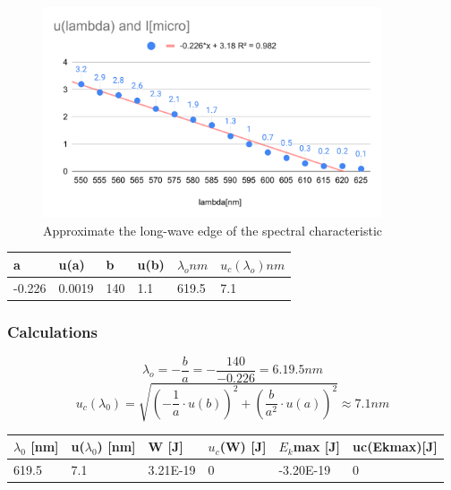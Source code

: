 \begin{figure}[H]
	\centering
	\includegraphics[width=10cm]{schematics/spectralCharacteristic.pdf}
	\caption{Approximate the long-wave edge of the spectral characteristic}
\end{figure}

\begin{table}[H]
    \centering
    \begin{tabular}{l|l|l|l|l|l}
        a & u(a) & b & u(b) & $\lambda_o nm$ & $u_c(\lambda_o) nm$ \\ \hline
        -0.226 & 0.0019 & 140 & 1.1 & 619.5 & 7.1 \\ 
    \end{tabular}
\end{table}

\subsubsection*{Calculations }

\begin{equation}
	\lambda_o = - \frac{b}{a} = -\frac{140}{-0.226} = 6.19.5 nm
\end{equation}
\begin{equation}
	u_c(\lambda_0)=\sqrt{(-\frac1a \cdot u(b))^2 + (\frac{b}{a^2} \cdot u(a))^2} \approx 7.1nm
\end{equation}

\begin{table}[H]
    \centering
    \begin{tabular}{l|l|l|l|l|l}

        $\lambda_0$ [nm] & u($\lambda_0$) [nm] & W [J] & $u_c$(W) [J] & $E_k$max [J] & uc(Ekmax)[J] \\ \hline
        619.5 & 7.1 & 3.21E-19 & 0 & -3.20E-19 & 0 \\ 
    \end{tabular}
\end{table}

